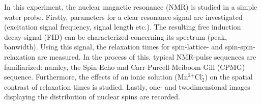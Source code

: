 \documentclass[../main.tex]{subfiles}
\begin{document}

In this experiment, the nuclear magnetic resonance (NMR) is studied in a simple water probe. Firstly, parameters for a clear resonance signal are investigated (excitation signal frequency, signal length etc.). The resulting free induction decay-signal (FID) can be characterized concerning its spectrum (peak, banwidth). Using this signal, the relaxation times for spin-lattice- and spin-spin-relaxation are measured. In the process of this, typical NMR-pulse sequences are familiarized: namley, the Spin-Echo and Carr-Purcell-Meiboom-Gill (CPMG) sequence. Furthermore, the effects of an ionic solution (Mn$^\text{2+}$Cl$_\text{2}^\text{-}$) on the spatial contrast of relaxation times is studied. Lastly, one- and twodimensional images displaying the distribution of nuclear spins are recorded.
\end{document}
